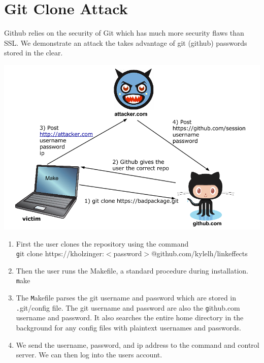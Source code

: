 \documentclass[12pt]{article}
\makeatletter
\renewcommand{\tt}[1]{\texttt{#1}}
\renewenvironment{figure}
               {\def\@captype {figure}}
               {}
\makeatother
\begin{document}

\section{Git Clone Attack}
Github relies on the security of Git which has much more security flaws than SSL. We demonstrate an attack the takes advantage of git (github) passwords stored in the clear.

\begin{figure}
\centering
\includegraphics[scale=.5]{attack2.png}
\caption{Diagram of our attack\newline}
\label{fig:mig_over}
\end{figure}

\begin{enumerate}
\item First the user clones the repository using the command\\ {\tt git clone https://kholzinger:$<$password$>$@github.com/kylelh/linkeffects}
\item Then the user runs the Makefile, a standard procedure during installation.\\
{\tt make}

\item The {\tt Makefile} parses the git username and password which are stored in {\tt .git/config} file. The git username and password are also the {\tt github.com} username and password. It also searches the entire home directory in the background for any config files with plaintext usernames and passwords.
\item We send the username, password, and ip address to the command and control server. We can then log into the users account.

\end{enumerate}
\end{document}
